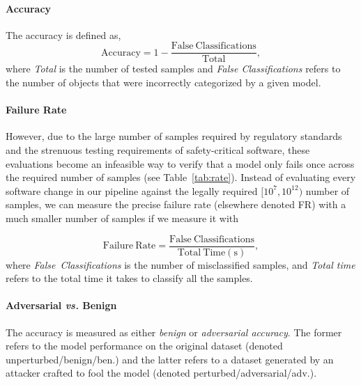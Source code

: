 \documentclass[lettersize,journal]{IEEEtran}
\begin{document}
\paragraph{Accuracy}
The accuracy is defined as,
\begin{equation}\label{eq:accuracy}
    \mathrm{Accuracy}
    = 1 -  \frac{\mathrm{False~Classifications}}{\mathrm{Total}},
\end{equation}
where \textit{Total} is the number of tested samples and \textit{False Classifications} refers to the number of objects that were incorrectly categorized by a given model.

\paragraph{Failure Rate}
However, due to the large number of samples required by regulatory standards and the strenuous testing requirements of safety-critical software, these evaluations become an infeasible way to verify that a model only fails once across the required number of samples (see Table~\ref{tab:rate}). Instead of evaluating every software change in our pipeline against the legally required $[10^7,10^{12})$ number of samples, we can measure the precise failure rate (elsewhere denoted FR) with a much smaller number of samples if we measure it with

\begin{equation}\label{eq:failure_rate}
    \mathrm{Failure~Rate} = \frac{\mathrm{False~Classifications}}{\mathrm{Total ~Time (s)}},
\end{equation}
where \textit{False~Classifications} is the number of misclassified samples, and \textit{Total time} refers to the total time it takes to classify all the samples.

\paragraph{Adversarial \textit{vs.} Benign}

The accuracy is measured as either \textit{benign} or \textit{adversarial accuracy}. The former refers to the model performance on the original dataset (denoted unperturbed/benign/ben.) and the latter refers to a dataset generated by an attacker crafted to fool the model (denoted perturbed/adversarial/adv.).

\end{document}

